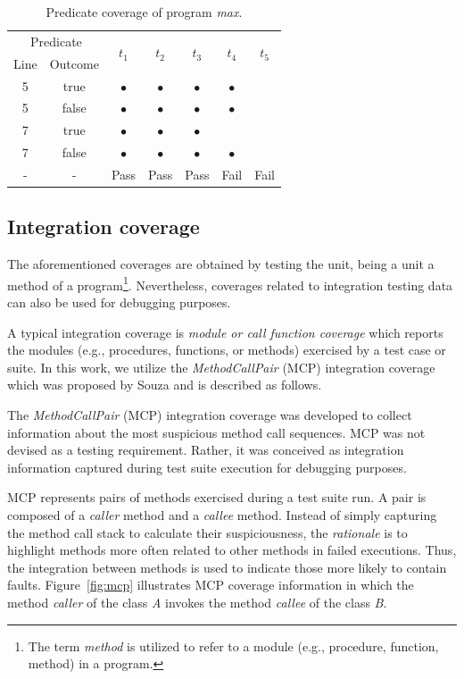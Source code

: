 \begin{table}
\center
\caption{Predicate coverage of program \textit{max}.\label{tab-cov-predicate}}
\begin{tabular}{|c|c|c|c|c|c|c|}
\hline \multicolumn{2}{|c|}{Predicate} &\multirow{2}{*}{$t_1$} & \multirow{2}{*}{$t_2$} & \multirow{2}{*}{$t_3$} & \multirow{2}{*}{$t_4$} & \multirow{2}{*}{$t_5$}  \\
  \cline{1-2} Line & Outcome & &  &  &  &   \\
  \hline 5 & true & $\bullet$ & $\bullet$ & $\bullet$ & $\bullet$ &    \\
  \hline 5 & false & $\bullet$ & $\bullet$ & $\bullet$ & $\bullet$ &  \\
  \hline 7 & true & $\bullet$ & $\bullet$ & $\bullet$ &  &   \\
  \hline 7 & false & $\bullet$ & $\bullet$ & $\bullet$ & $\bullet$  &   \\
  \hline - & - & Pass & Pass & Pass & Fail & Fail  \\
  \hline
\end{tabular}
\end{table}
\subsection{Integration coverage}
The aforementioned coverages are obtained by testing the unit, being a unit a
method of a program\footnote{The term \textit{method} is utilized to refer to a
module (e.g., procedure, function, method) in a program.}. Nevertheless,
coverages related to integration testing data can also be used for debugging
purposes.

A typical integration coverage is \textit{module or call function coverage}
which reports the modules (e.g., procedures, functions, or methods) exercised
by a test case or suite. In this work, we utilize the \textit{MethodCallPair}
(MCP) integration coverage which was proposed by Souza
\cite{souza2012depuracao,souza13adding} and is described as follows.

The \textit{MethodCallPair} (MCP) integration coverage was developed to collect
information about the most suspicious method call sequences. MCP was not devised
as a testing requirement. Rather, it was conceived as integration information
captured during test suite execution for debugging purposes.

MCP represents pairs of methods exercised during a test suite run. A pair is
composed of a \textit {caller} method and a \textit{callee}  method. Instead of
simply capturing the method call stack to calculate their suspiciousness, the
\textit{rationale} is to highlight methods more often related to other methods
in failed executions. Thus, the integration between methods is used to indicate
those more likely to contain faults.
Figure~\ref{fig:mcp} illustrates MCP coverage information in which the method
\textit{caller} of the class \textit{A} invokes the method \textit{callee} of
the class \textit {B}.

